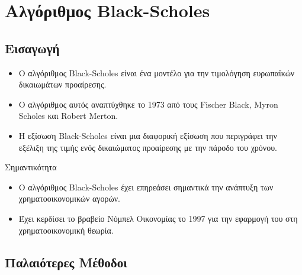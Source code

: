 \chapter{Αλγόριθμος Black-Scholes}
\label{chap:black_scholes}

\section{Εισαγωγή}
\begin{itemize}
  \item Ο αλγόριθμος Black-Scholes είναι ένα μοντέλο για την τιμολόγηση ευρωπαϊκών δικαιωμάτων προαίρεσης.
  \item Ο αλγόριθμος αυτός αναπτύχθηκε το 1973 από τους Fischer Black, Myron Scholes και Robert Merton.
  \item Η εξίσωση Black-Scholes είναι μια διαφορική εξίσωση που περιγράφει την εξέλιξη της τιμής ενός δικαιώματος προαίρεσης με την πάροδο του χρόνου.
\end{itemize}

Σημαντικότητα
  \begin{itemize}
    \item Ο αλγόριθμος Black-Scholes έχει επηρεάσει σημαντικά την ανάπτυξη των χρηματοοικονομικών αγορών.
    \item Έχει κερδίσει το βραβείο Νόμπελ Οικονομίας το 1997 για την εφαρμογή του στη χρηματοοικονομική θεωρία.
  \end{itemize}

\section{Παλαιότερες Μέθοδοι}

